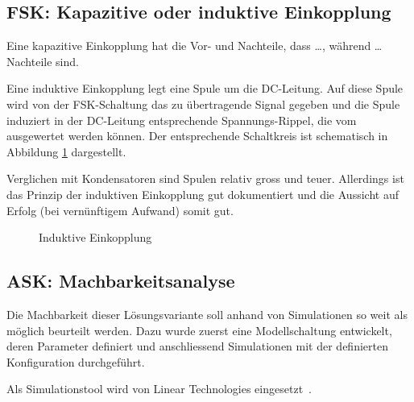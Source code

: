 \subsection{FSK: Kapazitive oder induktive Einkopplung}
\label{subsec:hw:fsk:kapaVsInduk}

Eine kapazitive Einkopplung hat die Vor- und Nachteile, dass \ldots, w\"ahrend
\ldots Nachteile sind.


Eine induktive Einkopplung legt eine  Spule um die DC-Leitung. Auf diese Spule
wird von der FSK-Schaltung das zu  \"ubertragende Signal gegeben und die Spule
induziert in  der DC-Leitung  entsprechende Spannungs-Rippel, die  vom \Master
ausgewertet werden k\"onnen. Der entsprechende  Schaltkreis ist schematisch in
Abbildung \ref{fig:circ:coupling:inductive} dargestellt.

Verglichen mit  Kondensatoren sind Spulen relativ  gross und teuer. Allerdings
ist das Prinzip  der induktiven Einkopplung gut dokumentiert  und die Aussicht
auf Erfolg (bei vern\"unftigem Aufwand) somit gut.

\begin{figure}[h!tb]
    \centering
    
    \caption{Induktive Einkopplung}
    \label{fig:circ:coupling:inductive}
\end{figure}


\subsection{ASK: Machbarkeitsanalyse}
\label{subsec:hw:ask:machbarkeit}

Die Machbarkeit dieser L\"osungsvariante soll anhand von Simulationen so weit als
m\"oglich beurteilt werden.
Dazu  wurde  zuerst  eine  Modellschaltung  entwickelt,  deren
Parameter  definiert  und  anschliessend   Simulationen  mit  der  definierten
Konfiguration durchgef\"uhrt.

Als   Simulationstool  wird      von  Linear   Technologies
eingesetzt~\cite{ref:ltspice}.


